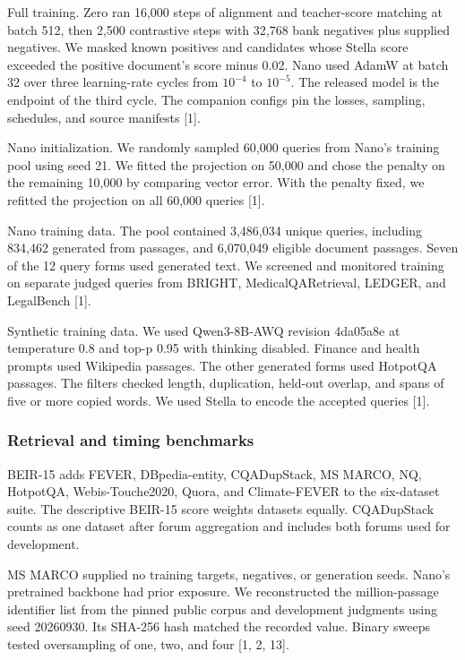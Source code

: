 \documentclass[
  english,
  10pt,
]{article}
\begin{document}
Full training. Zero ran 16,000 steps of alignment and teacher-score
matching at batch 512, then 2,500 contrastive steps with 32,768 bank
negatives plus supplied negatives. We masked known positives and
candidates whose Stella score exceeded the positive document's score
minus 0.02. Nano used AdamW at batch 32 over three learning-rate cycles
from \(10^{-4}\) to \(10^{-5}\). The released model is the endpoint of
the third cycle. The companion configs pin the losses, sampling,
schedules, and source manifests {[}1{]}.

Nano initialization. We randomly sampled 60,000 queries from Nano's
training pool using seed 21. We fitted the projection on 50,000 and
chose the penalty on the remaining 10,000 by comparing vector error.
With the penalty fixed, we refitted the projection on all 60,000 queries
{[}1{]}.

Nano training data. The pool contained 3,486,034 unique queries,
including 834,462 generated from passages, and 6,070,049 eligible
document passages. Seven of the 12 query forms used generated text. We
screened and monitored training on separate judged queries from BRIGHT,
MedicalQARetrieval, LEDGER, and LegalBench {[}1{]}.

Synthetic training data. We used Qwen3-8B-AWQ revision 4da05a8e at
temperature 0.8 and top-p 0.95 with thinking disabled. Finance and
health prompts used Wikipedia passages. The other generated forms used
HotpotQA passages. The filters checked length, duplication, held-out
overlap, and spans of five or more copied words. We used Stella to
encode the accepted queries {[}1{]}.

\subsubsection{Retrieval and timing
benchmarks}\label{retrieval-and-timing-benchmarks}

BEIR-15 adds FEVER, DBpedia-entity, CQADupStack, MS MARCO, NQ, HotpotQA,
Webis-Touche2020, Quora, and Climate-FEVER to the six-dataset suite. The
descriptive BEIR-15 score weights datasets equally. CQADupStack counts
as one dataset after forum aggregation and includes both forums used for
development.

MS MARCO supplied no training targets, negatives, or generation seeds.
Nano's pretrained backbone had prior exposure. We reconstructed the
million-passage identifier list from the pinned public corpus and
development judgments using seed 20260930. Its SHA-256 hash matched the
recorded value. Binary sweeps tested oversampling of one, two, and four
{[}1, 2, 13{]}.
\end{document}
